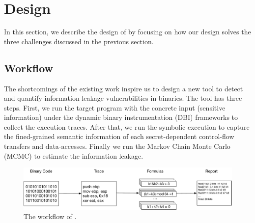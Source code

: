 \section{Design}
In this section, we describe the design of \tool{} by focusing on
how our design solves the three challenges discussed in the previous
section.

\subsection{Workflow}
The shortcomings of the existing work inspire us to design a new tool to detect
and quantify information leakage vulnerabilities in binaries. The tool has three
steps. First, we run the target program with the concrete input 
(sensitive information) under the dynamic binary instrumentation (DBI) frameworks
to collect the execution traces. After that, we run the symbolic execution 
to capture the fined-grained semantic information of each secret-dependent 
control-flow transfers and data-accesses. 
Finally we run the Markov Chain Monte Carlo (MCMC) to estimate the 
information leakage. 

\begin{figure}[ht]
    \centering
    \includegraphics[width=\textwidth]{./figures/workflow.pdf}
    \caption{The workflow of \tool{}. }
    \label{fig:Test}
\end{figure}

